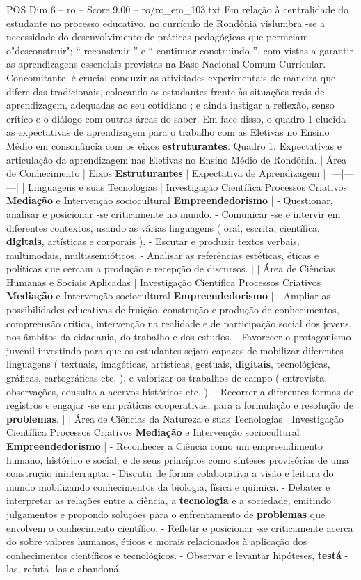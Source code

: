 \begin{textsample}{POS Dim 6 – ro – Score 9.00 – ro/ro\_em\_103.txt}
Em relação à centralidade do estudante no processo educativo, no currículo de Rondônia vislumbra -se a necessidade do desenvolvimento de práticas pedagógicas que permeiam o"desconstruir"; “ reconstruir ” e “ continuar construindo ”, com vistas a garantir as aprendizagens essenciais previstas na Base Nacional Comum Curricular.
Concomitante, é crucial conduzir as atividades experimentais de maneira que difere das tradicionais, colocando os estudantes frente às situações reais de aprendizagem, adequadas ao seu cotidiano ; e ainda instigar a reflexão, senso crítico e o diálogo com outras áreas do saber.
Em face disso, o quadro 1 elucida as expectativas de aprendizagem para o trabalho com as Eletivas no Ensino Médio em consonância com os eixos \textbf{estruturantes}.
Quadro 1.
Expectativas e articulação da aprendizagem nas Eletivas no Ensino Médio de Rondônia. | Área de Conhecimento | Eixos \textbf{Estruturantes} | Expectativa de Aprendizagem | |---|---|---| | Linguagens e suas Tecnologias | Investigação Científica Processos Criativos \textbf{Mediação} e Intervenção sociocultural \textbf{Empreendedorismo} | - Questionar, analisar e posicionar -se criticamente no mundo. - Comunicar -se e intervir em diferentes contextos, usando as várias linguagens ( oral, escrita, científica, \textbf{digitais}, artísticas e corporais ). - Escutar e produzir textos verbais, multimodais, multissemióticos. - Analisar as referências estéticas, éticas e políticas que cercam a produção e recepção de discursos. | | Área de Ciências Humanas e Sociais Aplicadas | Investigação Científica Processos Criativos \textbf{Mediação} e Intervenção sociocultural \textbf{Empreendedorismo} | - Ampliar as possibilidades educativas de fruição, construção e produção de conhecimentos, compreensão crítica, intervenção na realidade e de participação social dos jovens, nos âmbitos da cidadania, do trabalho e dos estudos. - Favorecer o protagonismo juvenil investindo para que os estudantes sejam capazes de mobilizar diferentes linguagens ( textuais, imagéticas, artísticas, gestuais, \textbf{digitais}, tecnológicas, gráficas, cartográficas etc. ), e valorizar os trabalhos de campo ( entrevista, observações, consulta a acervos históricos etc. ). - Recorrer a diferentes formas de registros e engajar -se em práticas cooperativas, para a formulação e resolução de \textbf{problemas}. | | Área de Ciências da Natureza e suas Tecnologias | Investigação Científica Processos Criativos \textbf{Mediação} e Intervenção sociocultural \textbf{Empreendedorismo} | - Reconhecer a Ciência como um empreendimento humano, histórico e social, e de seus princípios como sínteses provisórias de uma construção ininterrupta. - Discutir de forma colaborativa a visão e leitura do mundo mobilizando conhecimentos da biologia, física e química. - Debater e interpretar as relações entre a ciência, a \textbf{tecnologia} e a sociedade, emitindo julgamentos e propondo soluções para o enfrentamento de \textbf{problemas} que envolvem o conhecimento científico. - Refletir e posicionar -se criticamente acerca do sobre valores humanos, éticos e morais relacionados à aplicação dos conhecimentos científicos e tecnológicos. - Observar e levantar hipóteses, \textbf{testá} -las, refutá -las e abandoná 
\end{textsample}
